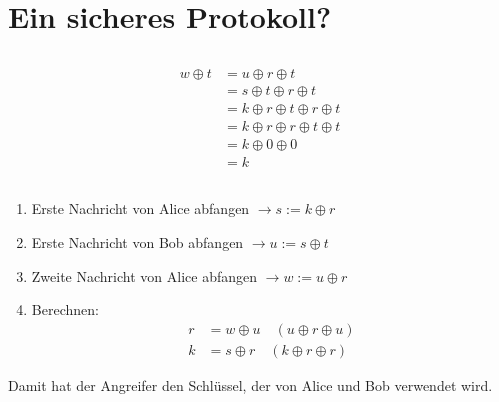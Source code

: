 \documentclass{../crypto}
\begin{document}
\section{Ein sicheres Protokoll?}
\subsection{}
\begin{align*}
	w \oplus t & = u \oplus r \oplus t                   \\
	           & = s \oplus t \oplus r \oplus t          \\
	           & = k \oplus r \oplus t \oplus r \oplus t \\
	           & = k \oplus r \oplus r \oplus t \oplus t \\
	           & = k \oplus 0 \oplus 0                   \\
	           & = k
\end{align*}

\subsection{}
\begin{enumerate}
    \item Erste Nachricht von Alice abfangen $\rightarrow s := k \oplus r$
    \item Erste Nachricht von Bob abfangen $\rightarrow u := s \oplus t$
    \item Zweite Nachricht von Alice abfangen $\rightarrow w := u \oplus r$
    \item Berechnen: 
        \begin{align*}
           r & = w \oplus u \quad \left(u \oplus r \oplus u\right)\\
           k & = s \oplus r \quad \left(k \oplus r \oplus r\right)
        \end{align*}
\end{enumerate}
Damit hat der Angreifer den Schlüssel, der von Alice und Bob verwendet wird.
\end{document}
